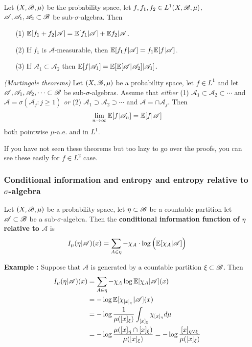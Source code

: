 \documentclass[10pt,a4paper]{report}
\begin{document}
\thm Let $(X, \mathscr{B}, \mu)$ be the probability space, let $f,f_1,f_2\in L^1(X, \mathscr{B}, \mu)$, $\mathscr{A},\mathscr{A}_1,\mathscr{A}_2 \subset \mathscr{B}$ be sub-$\sigma$-algebra. Then
\begin{itemize}
\item[(1)] $\mathbb{E}[f_1 + f_2 | \mathscr{A}] = \mathbb{E}[f_1 |\mathscr{A}] + \mathbb{E}{f_2 | \mathscr{A}}$.
\item[(2)] If $f_1$ is $\mathscr{A}$-measurable, then $\mathbb{E}[f_1 f | \mathscr{A}] = f_1 \mathbb{E}[f|\mathscr{A}]$.
\item[(3)] If $\mathscr{A}_1 \subset \mathscr{A}_2$ then $\mathbb{E}[f|\mathscr{A}_1] = \mathbb{E}[\mathbb{E}[\mathscr{A}|\mathscr{A}_2]|\mathscr{A}_1]$.
\end{itemize}
\s

\thm \emph{(Martingale theorems)} Let $(X,\mathscr{B}, \mu)$ be a probability space, let $f\in L^1$ and let $\mathscr{A},\mathscr{A}_1,\mathscr{A}_2, \cdots \subset \mathscr{B}$ be sub-$\sigma$-algebras. Assume that \emph{either} (1) $\mathscr{A}_1 \subset \mathscr{A}_2 \subset \cdots$ and $\mathscr{A} = \sigma(\mathscr{A}_j : j\geq 1)$ \emph{or} (2) $\mathscr{A}_1 \supset \mathscr{A}_2 \supset \cdots$ and $\mathscr{A} = \cap \mathscr{A}_j$. Then
\begin{align*}
\lim_{n\rightarrow \infty} \mathbb{E}[f| \mathscr{A}_n] = \mathbb{E}[f|\mathscr{A}]
\end{align*}
both pointwise $\mu$-a.e. and in $L^1$.
\s

If you have not seen these theorems but too lazy to go over the proofs, you can see these easily for $f\in L^2$ case.

\subsubsection*{Conditional information and entropy and entropy relative to $\sigma$-algebra}

Let $(X,\mathscr{B}, \mu)$ be a probability space, let $\eta \subset \mathscr{B}$ be a countable partition let $\mathscr{A} \subset \mathscr{B}$ be a sub-$\sigma$-algebra. Then the \textbf{conditional information function of $\eta$ relative to $\mathscr{A}$} is
\begin{align*}
I_{\mu}(\eta | \mathscr{A}) (x) = \sum_{A \in \eta} -\chi_A \cdot \log \Big( \mathbb{E}[\chi_A | \mathscr{A}] \Big)
\end{align*}
\s

\textbf{Example :} Suppose that $\mathscr{A}$ is generated by a countable partition $\xi \subset \mathscr{B}$. Then
\begin{align*}
I_{\mu}(\eta | \mathscr{A})(x) &= \sum_{A \in \eta} -\chi_A \log \mathbb{E} [\chi_A | \mathscr{A}](x) \\
&= -\log \mathbb{E}[ \chi_{[x]_{\eta}} | \mathscr{A}] (x)  \\
&= -\log \frac{1}{\mu([x]_{\xi})} \int_{[x]_{\xi}} \chi_{[x]_{\eta}} d\mu \\
&= -\log \frac{\mu([x]_{\eta} \cap [x]_{\xi} )}{\mu([x]_{\xi})} = -\log \frac{[x]_{\eta \vee \xi}}{\mu([x]_{\xi})}
\end{align*}
\s
\end{document}
